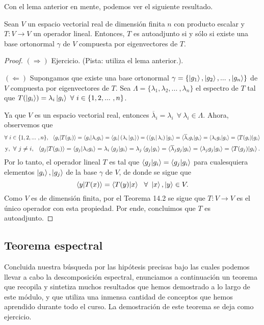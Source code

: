 \documentclass[12pt,dvipsnames]{article}
\newenvironment{teorema}[2][Teorema]{\begin{trivlist}
\item[\hskip \labelsep {\bfseries #1}\hskip \labelsep {\bfseries #2.}]}{\end{trivlist}}
\begin{document}
Con el lema anterior en mente, podemos ver el siguiente resultado.

\begin{teorema} {15.2.2}
    Sean $V$ un espacio vectorial real de dimensión finita $n$ con producto escalar y $T:V\to V$ un operador lineal. Entonces, $T$ es autoadjunto si y sólo si existe una base ortonormal $\gamma$ de $V$ compuesta por eigenvectores de $T$.

    \begin{proof}
    $(\Rightarrow)$ Ejercicio. (Pista: utiliza el lema anterior.).

        \vspace{3mm}
        $(\Leftarrow)$ Supongamos que existe una base ortonormal $\gamma=\{\ket{g_1}, \ket{g_2}, ... \ ,\ket{g_n}\}$ de $V$ compuesta por eigenvectores de $T$. Sea $\Lambda=\{\lambda_1,\lambda_2, ... \ ,\lambda_n\}$ el espectro de $T$ tal que $T(\ket{g_i})=\lambda_i \ket{g_i} \ \forall \ i\in\{1,2,... \ ,n\}$. 

        \vspace{3mm}
        Ya que $V$ es un espacio vectorial real, entonces $\overline{\lambda}_i = \lambda_i \ \ \forall \ \lambda_i\in\Lambda$. Ahora, observemos que \[
            \forall \ i\in \{1,2,... \ ,n\}, \ \ \braket{g_i|T(g_i)} = \braket{g_i|\lambda_i g_i} = \bra{g_i}(\lambda_i \ket{g_i}) = (\bra{g_i}\lambda_i)\ket{g_i} = \braket{\overline{\lambda}_i g_i|g_i} = \braket{\lambda_i g_i | g_i} = \braket{T(g_i)|g_i}
        \] \[
        \text{y}, \ \forall \ j\neq i, \ \ \braket{g_j|T(g_i)} = \braket{g_j|\lambda_i g_i} = \lambda_i \braket{g_j|g_i} = \lambda_j \braket{g_j|g_i} = \braket{\overline{\lambda}_j g_j|g_i} = \braket{\lambda_j g_j|g_i} = \braket{T(g_j)|g_i}.
    \] Por lo tanto, el operador lineal $T$ es tal que $\braket{g_j|g_i} = \braket{g_j|g_i}$ para cualesquiera elementos $\ket{g_i}, \ket{g_j}$ de la base $\gamma$ de $V$, de donde se sigue que \[
    \braket{y|T(x)}=\braket{T(y)|x} \ \ \forall \ \ket{x},\ket{y}\in V.
\] Como $V$ es de dimensión finita, por el Teorema 14.2 se sigue que $T:V\to V$ es el único operador con esta propiedad. Por ende, concluimos que $T$ es autoadjunto.
    \end{proof}
\end{teorema}


\subsection{Teorema espectral}

Concluida nuestra búsqueda por las hipótesis precisas bajo las cuales podemos llevar a cabo la descomposición espectral, enunciamos a continuación un teorema que recopila y sintetiza muchos resultados que hemos demostrado a lo largo de este módulo, y que utiliza una inmensa cantidad de conceptos que hemos aprendido durante todo el curso. La demostración de este teorema se deja como ejercicio.
\end{document}

